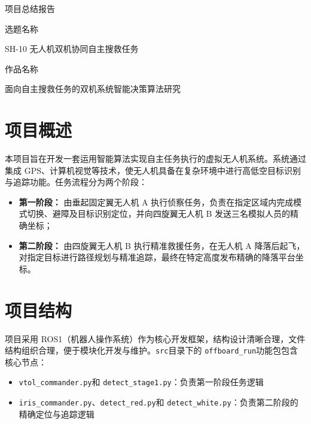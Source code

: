 \documentclass[12pt]{article}
\begin{document}
\begin{center}
    \vspace*{1cm}
    {\Huge 项目总结报告}
    
    \vspace{1.5cm}
    {\LARGE 选题名称}
    
    \vspace{0.5cm}
    {\Large SH-10 无人机双机协同自主搜救任务}
    
    \vspace{1.5cm}
    {\LARGE 作品名称}
    
    \vspace{0.5cm}
    {\Large 面向自主搜救任务的双机系统智能决策算法研究}
\end{center}

\newpage

\section{项目概述}
本项目旨在开发一套运用智能算法实现自主任务执行的虚拟无人机系统。系统通过集成 GPS、计算机视觉等技术，使无人机具备在复杂环境中进行高低空目标识别与追踪功能。任务流程分为两个阶段：

\begin{itemize}
    \item \textbf{第一阶段：} 由垂起固定翼无人机 A 执行侦察任务，负责在指定区域内完成模式切换、避障及目标识别定位，并向四旋翼无人机 B 发送三名模拟人员的精确坐标；
    \item \textbf{第二阶段：} 由四旋翼无人机 B 执行精准救援任务，在无人机 A 降落后起飞，对指定目标进行路径规划与精准追踪，最终在特定高度发布精确的降落平台坐标。
\end{itemize}

\section{项目结构}
项目采用 ROS1（机器人操作系统）作为核心开发框架，结构设计清晰合理，文件结构组织合理，便于模块化开发与维护。\texttt{src}目录下的 \texttt{offboard\_run}功能包包含核心节点：

\begin{itemize}
    \item \texttt{vtol\_commander.py}和 \texttt{detect\_stage1.py}：负责第一阶段任务逻辑
    \item \texttt{iris\_commander.py}、\texttt{detect\_red.py}和 \texttt{detect\_white.py}：负责第二阶段的精确定位与追踪逻辑
\end{itemize}
\end{document}
